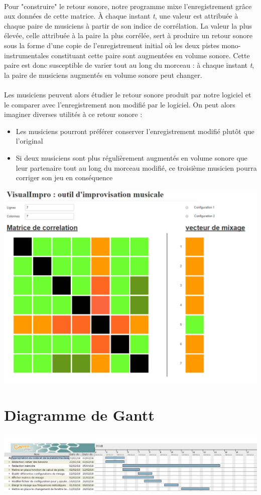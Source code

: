 \documentclass{article}
\begin{document}
\paragraph{}
Pour "construire" le retour sonore, notre programme mixe l'enregistrement
grâce aux données de cette matrice. À chaque instant \textit{t}, une valeur
est attribuée à chaque paire de musiciens à partir de son indice de
corrélation. La valeur la plus élevée, celle attribuée à la paire la plus
corrélée, sert à produire un retour sonore sous la forme d'une copie de
l'enregistrement initial où les deux pistes mono-instrumentales constituant
cette paire sont augmentées en volume sonore. Cette paire est donc susceptible
de varier tout au long du morceau : à chaque instant \textit{t}, la paire de
musiciens augmentés en volume sonore peut changer.
\paragraph{}
Les musiciens peuvent alors étudier le retour sonore produit par notre logiciel
et le comparer avec l'enregistrement non modifié par le logiciel. On peut
alors imaginer diverses utilités à ce retour sonore :
\begin{itemize}
 \item Les musiciens pourront préférer conserver l'enregistrement modifié plutôt
       que l'original
 \item Si deux musiciens sont plus régulièrement augmentés en volume sonore que
       leur partenaire tout au long du morceau modifié, ce troisième musicien pourra
       corriger son jeu en conséquence
\end{itemize}


\centering
\includegraphics[scale=0.30]{proto_2.png}

\section{Diagramme de Gantt}
\includegraphics[scale=0.35]{DiagrammeAnalyseBesoins.jpg}

\end{document}
